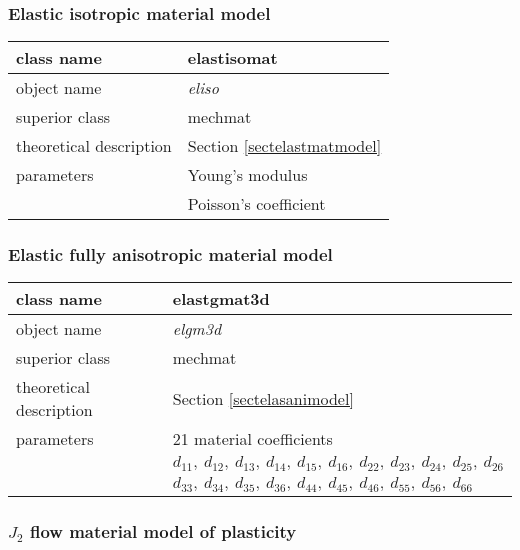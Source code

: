 \subsubsection{Elastic isotropic material model}

\begin{center}
\begin{tabular}{|l|l|}
\hline
class name & {\sf elastisomat}\index{class!{\sf elastisomat}}
\\ \hline
object name & {\it eliso}\index{instance!{\it eliso}}
\\ \hline
superior class & {\sf mechmat}
\\ \hline
theoretical description & Section \ref{sectelastmatmodel}
\\ \hline
parameters & Young's modulus
\\
 & Poisson's coefficient
\\ \hline
\end{tabular}
\end{center}

\subsubsection{Elastic fully anisotropic material model}

\begin{center}
\begin{tabular}{|l|l|}
\hline
class name & {\sf elastgmat3d}\index{class!{\sf elastgmat3d}}
\\ \hline
object name & {\it elgm3d}\index{instance!{\it elgm3d}}
\\ \hline
superior class & {\sf mechmat}
\\ \hline
theoretical description & Section \ref{sectelasanimodel}
\\ \hline
parameters & 21 material coefficients
\\
 & $d_{11},\ d_{12},\ d_{13},\ d_{14},\ d_{15},\ d_{16},\ d_{22},\ d_{23},\ d_{24},\ d_{25},\ d_{26}$
\\
 & $d_{33},\ d_{34},\ d_{35},\ d_{36},\ d_{44},\ d_{45},\ d_{46},\ d_{55},\ d_{56},\ d_{66}$
\\ \hline
\end{tabular}
\end{center}

\subsubsection{$J_2$ flow material model of plasticity}

